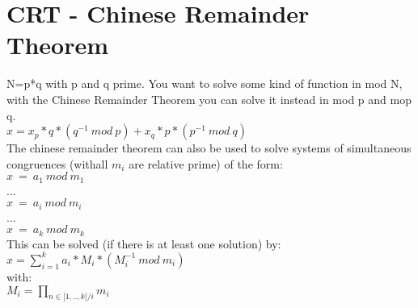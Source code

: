 \documentclass{article}
\begin{document}
\section*{CRT - Chinese Remainder Theorem}
N=p*q with p and q prime. You want to solve some kind of function in mod N, with the Chinese Remainder Theorem you can solve it instead in mod p and mop q. \\[10pt]
$x = x_p*q*(q^{-1}\ mod\ p) + x_q*p*(p^{-1}\ mod\ q)$\\[20pt]
The chinese remainder theorem can also be used to solve systems of simultaneous congruences (withall $m_i$ are relative prime) of the form:\\[5pt]
$x\ =\ a_1\ mod\ m_1$\\
...\\
$x\ =\ a_i\ mod\ m_i$\\
...\\
$x\ =\ a_k\ mod\ m_k$\\[10pt]
This can be solved (if there is at least one solution) by:\\[5pt]
$x = \sum\limits_{i=1}^k a_i*M_i*(M_i^{-1}\ mod\ m_i)$\\[10pt]
with:\\[10pt]
$M_i = \prod\limits_{n\in \lbrack1,..,k\rbrack/i}m_i$\\
\end{document}
